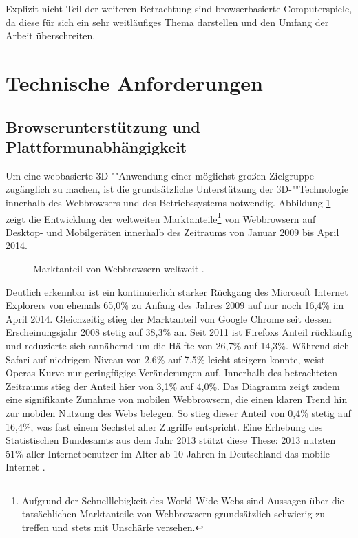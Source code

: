 Explizit nicht Teil der weiteren Betrachtung sind browserbasierte Computerspiele, da diese für sich ein sehr weitläufiges Thema darstellen und den Umfang der Arbeit überschreiten.

\section{Technische Anforderungen}

\subsection{Browserunterstützung und Plattformunabhängigkeit}
Um eine webbasierte 3D-""Anwendung einer möglichst großen Zielgruppe zugänglich zu machen, ist die grundsätzliche Unterstützung der 3D-""Technologie innerhalb des Webbrowsers und des Betriebssystems notwendig. Abbildung \ref{FIG_BROWSER_MARKETSHARE} zeigt die Entwicklung der weltweiten Marktanteile\footnote{Aufgrund der Schnelllebigkeit des World Wide Webs sind Aussagen über die tatsächlichen Marktanteile von Webbrowsern grundsätzlich schwierig zu treffen und stets mit Unschärfe versehen.} von Webbrowsern auf Desktop- und Mobilgeräten innerhalb des Zeitraums von Januar 2009 bis April 2014.

\begin{figure}[ht]
	\centering
	\footnotesize
	
	\caption{Marktanteil von Webbrowsern weltweit \autocite{STATCOUNTER_BROWSERS_09_14}.}
	\label{FIG_BROWSER_MARKETSHARE}
\end{figure}

Deutlich erkennbar ist ein kontinuierlich starker Rückgang des Microsoft Internet Explorers von ehemals 65,0\% zu Anfang des Jahres 2009 auf nur noch 16,4\% im April 2014. Gleichzeitig stieg der Marktanteil von Google Chrome seit dessen Erscheinungsjahr 2008 stetig auf 38,3\% an. Seit 2011 ist Firefoxs Anteil rückläufig und reduzierte sich annähernd um die Hälfte von 26,7\% auf 14,3\%. Während sich Safari auf niedrigem Niveau von 2,6\% auf 7,5\% leicht steigern konnte, weist Operas Kurve nur geringfügige Veränderungen auf. Innerhalb des betrachteten Zeitraums stieg der Anteil hier von 3,1\% auf 4,0\%.
Das Diagramm zeigt zudem eine signifikante Zunahme von mobilen Webbrowsern, die einen klaren Trend hin zur mobilen Nutzung des Webs belegen. So stieg dieser Anteil von 0,4\% stetig auf 16,4\%, was fast einem Sechstel aller Zugriffe entspricht. Eine Erhebung des Statistischen Bundesamts aus dem Jahr 2013 stützt diese These: 2013 nutzten 51\% aller Internetbenutzer im Alter ab 10 Jahren in Deutschland das mobile Internet \autocite{DESTATIS_MOBILE_INTERNET_USERS}.

